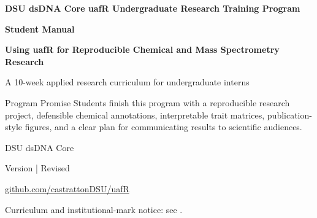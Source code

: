 \documentclass[11pt,oneside]{book}
\begin{document}

\begin{titlepage}
\pagecolor{DSULightBlue}
\begin{center}
\vspace*{0.08in}
\CoreLogoBand

\vspace{0.28in}
{\Huge\bfseries\color{DSURed} DSU dsDNA Core uafR Undergraduate Research Training Program\par}
\vspace{0.18in}
{\LARGE\bfseries Student Manual\par}
\vspace{0.22in}
{\Large\bfseries Using uafR for Reproducible Chemical and Mass Spectrometry Research\par}
\vspace{0.25in}
{\large A 10-week applied research curriculum for undergraduate interns\par}

\vfill
\begin{programbox}[width=0.86\textwidth]{Program Promise}
Students finish this program with a reproducible research project, defensible chemical annotations, interpretable trait matrices, publication-style figures, and a clear plan for communicating results to scientific audiences.
\end{programbox}

\vfill
{\large DSU dsDNA Core\par}
{\large Version \TrainingVersion\space | Revised \TrainingRevisionDate\par}
{\large\href{\TrainingRepository}{github.com/castrattonDSU/uafR}\par}
\vspace{0.12in}
{\small Curriculum and institutional-mark notice: see .\par}
\end{center}
\end{titlepage}
\nopagecolor

\frontmatter
\tableofcontents



\mainmatter

















\appendix





\backmatter
\nocite{pubchem2019,pubchemPugRest2018,pubchemPugRestDocs,kegg2021,keggApiDocs,lotus2022,msiCawg2007,viant2019,rmarkdown2024,wilson2017}


\end{document}
